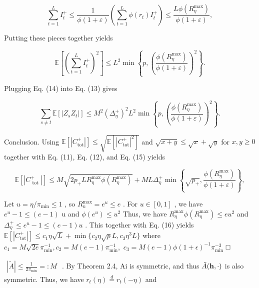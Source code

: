 \documentclass[
  10
]{article}
\begin{document}
\[
\sum_ {t = 1} ^ {L} I _ {t} ^ {+} \leq \frac {1}{\phi (1 + \varepsilon)} \left(\sum_ {t = 1} ^ {L} \phi (r _ {t}) I _ {t} ^ {+}\right) \leq \frac {L \phi (R _ {\eta} ^ {\max})}{\phi (1 + \varepsilon)},
\]

Putting these pieces together yields

\[
\mathbb {E} \left[ \left(\sum_ {t = 1} ^ {L} I _ {t} ^ {+}\right) ^ {2} \right] \leq L ^ {2} \min \left\{p, \left(\frac {\phi (R _ {\eta} ^ {\max})}{\phi (1 + \varepsilon)}\right) ^ {2} \right\}. \tag {14}
\]

Plugging Eq. (14) into Eq. (13) gives

\[
\sum_ {s \neq t} \mathbb {E} [ | Z _ {s} Z _ {t} | ] \leq M ^ {2} (\Delta_ {\eta} ^ {+}) ^ {2} L ^ {2} \min \left\{p, \left(\frac {\phi (R _ {\eta} ^ {\max})}{\phi (1 + \varepsilon)}\right) ^ {2} \right\}. \tag {15}
\]

Conclusion. Using
\(\mathbb { E } [ | C _ { \mathrm { t o t } } ^ { + } | ] \le \sqrt { \mathbb { E } [ | C _ { \mathrm { t o t } } ^ { + } | ^ { 2 } ] }\)
and \({ \sqrt { x + y } } \leq { \sqrt { x } } + { \sqrt { y } }\) for
\(x , y \geq 0\) together with Eq. (11), Eq. (12), and Eq. (15) yields

\[
\mathbb {E} \left[ \left| C _ {\text { tot }} ^ {+} \right| \right] \leq M \sqrt {2 p _ {+} L R _ {\eta} ^ {\max} \phi \left(R _ {\eta} ^ {\max}\right)} + M L \Delta_ {\eta} ^ {+} \min \left\{\sqrt {p _ {+}}, \frac {\phi \left(R _ {\eta} ^ {\max}\right)}{\phi (1 + \varepsilon)} \right\}, \tag {16}
\]

Let \(u = \eta / \pi _ { \mathrm { m i n } } \leq 1\) , so
\(R _ { n } ^ { \mathrm { m a x } } = e ^ { u } \leq e\) . For
\(u \in [ 0 , 1 ]\) , we have \(e ^ { u } - 1 \leq ( e - 1 )\) u and
\(\phi ( e ^ { u } ) \leq u ^ { 2 }\) Thus, we have
\(R _ { \eta } ^ { \operatorname* { m a x } } \phi ( R _ { \eta } ^ { \operatorname* { m a x } } ) \le e u ^ { 2 }\)
and \(\Delta _ { \eta } ^ { + } \leq e ^ { u } - 1 \leq ( e - 1 ) u\) .
This together with Eq. (16) yields
\(\mathbb { E } [ | C _ { \mathrm { t o t } } ^ { + } | ] \le c _ { 1 } \eta \sqrt { L } + \operatorname* { m i n } \{ c _ { 2 } \eta \sqrt { p } L , c _ { 3 } \eta ^ { 3 } L \}\)
where
\(c _ { 1 } = M \sqrt { 2 e } \pi _ { \mathrm { m i n } } ^ { - 1 } , c _ { 2 } = M ( e - 1 ) \pi _ { \mathrm { m i n } } ^ { - 1 } ,\)
\(c _ { 3 } = M ( e - 1 ) \phi ( 1 + \epsilon ) ^ { - 1 } \pi _ { \operatorname* { m i n } } ^ { - 3 }\)
□

\(\begin{array} { r } { | \tilde { A } | \le \frac { 1 } { 2 \pi _ { \operatorname* { m i n } } } = : M } \end{array}\)
. By Theorem 2.4, Ai is symmetric, and thus
\(\tilde { A } ( { \bf h } , \cdot )\) is also symmetric. Thus, we have
\(r _ { t } ( \eta ) \stackrel { d } { = } r _ { t } ( - \eta )\) and
\end{document}
